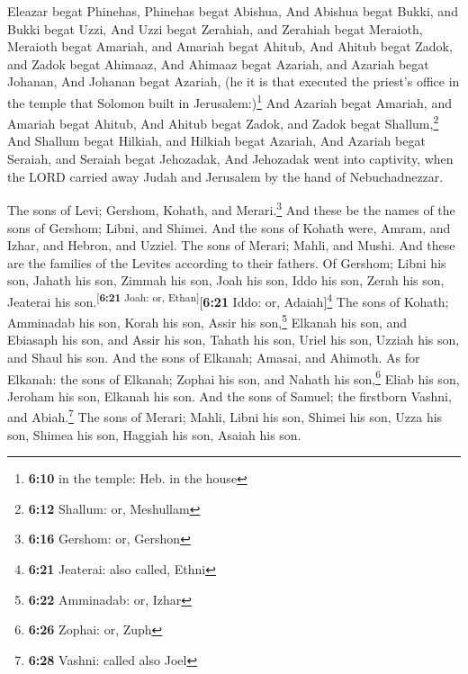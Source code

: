  Eleazar begat Phinehas, Phinehas begat Abishua,
 And Abishua begat Bukki, and Bukki begat Uzzi,
 And Uzzi begat Zerahiah, and Zerahiah begat Meraioth,
 Meraioth begat Amariah, and Amariah begat Ahitub,
 And Ahitub begat Zadok, and Zadok begat Ahimaaz,
 And Ahimaaz begat Azariah, and Azariah begat Johanan,
 And Johanan begat Azariah, (he it is that executed the
priest's office in the temple that Solomon built in
Jerusalem:)\footnote{\textbf{6:10} in the temple: Heb. in the house}
 And Azariah begat Amariah, and Amariah begat Ahitub,
 And Ahitub begat Zadok, and Zadok begat
Shallum,\footnote{\textbf{6:12} Shallum: or, Meshullam} 
And Shallum begat Hilkiah, and Hilkiah begat Azariah, 
And Azariah begat Seraiah, and Seraiah begat Jehozadak, 
And Jehozadak went into captivity, when the LORD carried away Judah and
Jerusalem by the hand of Nebuchadnezzar.

 The sons of Levi; Gershom, Kohath, and
Merari.\footnote{\textbf{6:16} Gershom: or, Gershon}  And
these be the names of the sons of Gershom; Libni, and Shimei.
 And the sons of Kohath were, Amram, and Izhar, and
Hebron, and Uzziel.  The sons of Merari; Mahli, and
Mushi. And these are the families of the Levites according to their
fathers.  Of Gershom; Libni his son, Jahath his son,
Zimmah his son,  Joah his son, Iddo his son, Zerah his
son, Jeaterai his son.\textsuperscript{{[}\textbf{6:21} Joah: or,
Ethan{]}}{[}\textbf{6:21} Iddo: or, Adaiah{]}\footnote{\textbf{6:21}
  Jeaterai: also called, Ethni}  The sons of Kohath;
Amminadab his son, Korah his son, Assir his son,\footnote{\textbf{6:22}
  Amminadab: or, Izhar}  Elkanah his son, and Ebiasaph
his son, and Assir his son,  Tahath his son, Uriel his
son, Uzziah his son, and Shaul his son.  And the sons of
Elkanah; Amasai, and Ahimoth.  As for Elkanah: the sons
of Elkanah; Zophai his son, and Nahath his son,\footnote{\textbf{6:26}
  Zophai: or, Zuph}  Eliab his son, Jeroham his son,
Elkanah his son.  And the sons of Samuel; the firstborn
Vashni, and Abiah.\footnote{\textbf{6:28} Vashni: called also Joel}
 The sons of Merari; Mahli, Libni his son, Shimei his
son, Uzza his son,  Shimea his son, Haggiah his son,
Asaiah his son.

